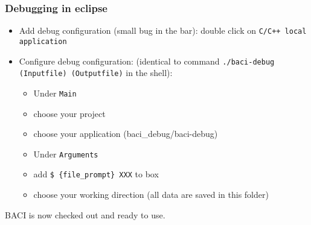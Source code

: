 \begin{enumerate}
\end{enumerate}

\subsubsection{Debugging in eclipse}

\begin{itemize}

\item Add debug configuration (small bug in the bar): double click on \texttt{C/C++ local application}

\item Configure debug configuration: (identical to command \texttt{./baci-debug (Inputfile) (Outputfile)} in the shell):

\begin{itemize}
\item Under \texttt{Main}
\item choose your project
\item choose your application (baci\_debug/baci-debug)
\item Under \texttt{Arguments}
\item add \texttt{\$ \{file\_prompt\} XXX} to box
\item choose your working direction (all data are saved in this folder)
\end{itemize}

\end{itemize}

BACI is now checked out and ready to use.

